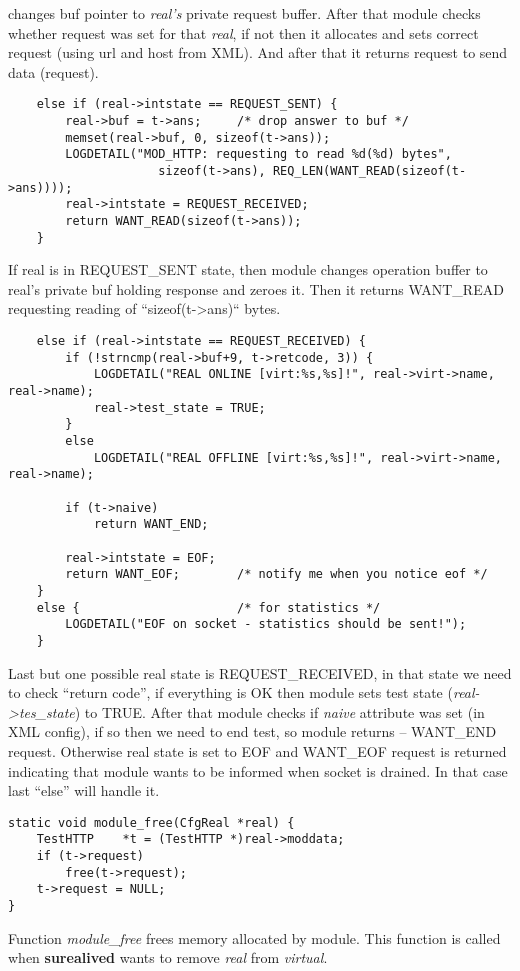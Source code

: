 \documentclass[polish,12pt]{article}
\begin{document}
changes buf pointer to \textit{real's} private request buffer. After that
module checks whether request was set for that \textit{real}, if not
then it allocates and sets correct request (using url and host from XML).
And after that it returns request to send data (request).
\newline
{\small
\begin{verbatim}
    else if (real->intstate == REQUEST_SENT) {
        real->buf = t->ans;     /* drop answer to buf */
        memset(real->buf, 0, sizeof(t->ans));
        LOGDETAIL("MOD_HTTP: requesting to read %d(%d) bytes",
                     sizeof(t->ans), REQ_LEN(WANT_READ(sizeof(t->ans))));
        real->intstate = REQUEST_RECEIVED;
        return WANT_READ(sizeof(t->ans));
    }
\end{verbatim}
}
If real is in REQUEST\_SENT state, then module changes operation buffer
to real's private buf holding response and zeroes it.
Then it returns WANT\_READ requesting reading of ``sizeof(t->ans)`` bytes.

\newpage
{\small
\begin{verbatim}
    else if (real->intstate == REQUEST_RECEIVED) {
        if (!strncmp(real->buf+9, t->retcode, 3)) {
            LOGDETAIL("REAL ONLINE [virt:%s,%s]!", real->virt->name, real->name);
            real->test_state = TRUE;
        }
        else
            LOGDETAIL("REAL OFFLINE [virt:%s,%s]!", real->virt->name, real->name);

        if (t->naive)
            return WANT_END;

        real->intstate = EOF;
        return WANT_EOF;        /* notify me when you notice eof */
    }
    else {                      /* for statistics */
        LOGDETAIL("EOF on socket - statistics should be sent!");
    }
\end{verbatim}
}
Last but one possible real state is REQUEST\_RECEIVED,
in that state we need to check ``return code'', if everything is OK then module
sets test state (\textit{real->tes\_state}) to TRUE. \newline
After that module checks if \textit{naive} attribute was set (in XML config), if so
then we need to end test, so module returns -- WANT\_END request.
Otherwise real state is set to EOF and WANT\_EOF request is returned indicating
that module wants to be informed when socket is drained. In that case
last ``else'' will handle it.

\begin{verbatim}
static void module_free(CfgReal *real) {
    TestHTTP    *t = (TestHTTP *)real->moddata;
    if (t->request)
        free(t->request);
    t->request = NULL;
}
\end{verbatim}
Function \textit{module\_free} frees memory allocated by module. This function
is called when \textbf{surealived} wants to remove \textit{real} from \textit{virtual}.
\end{document}
